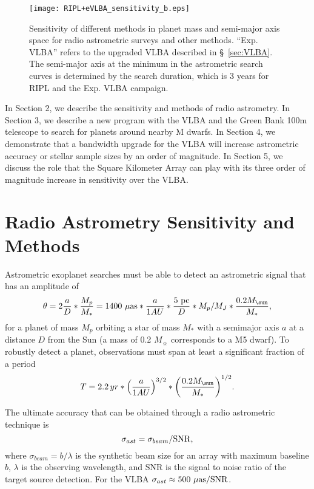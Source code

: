 \documentclass[12pt,preprint]{aastex}
\begin{document}
\begin{figure}[tb]
\texttt{[image: RIPL+eVLBA\_sensitivity\_b.eps]}
\caption{Sensitivity of different methods in planet mass and semi-major axis
space for radio astrometric surveys and other methods.
``Exp. VLBA'' refers to the upgraded VLBA described in \S~\ref{sec:VLBA}.
The semi-major axis at the 
minimum in the astrometric search curves is determined by the search duration,
which is 3 years for RIPL and the Exp. VLBA campaign.}
\label{fig:pspace}
\end{figure}

In Section 2, we describe the sensitivity and methods of radio astrometry.
In Section 3, we describe a new program with the VLBA and the Green Bank 100m
telescope to search for planets around nearby M dwarfs.  In Section 4, we
demonstrate that a bandwidth upgrade for the VLBA will increase astrometric
accuracy or stellar sample sizes by an order of magnitude.  In Section 5,
we discuss the role that the Square Kilometer Array can play with its three
order of magnitude increase in sensitivity over the VLBA.

\section{Radio Astrometry Sensitivity and Methods}

Astrometric exoplanet searches must be able to detect an astrometric
 signal that has an amplitude of
\begin{equation}
\theta = 2 {a \over D} * {M_{p} \over M_{*} } = 
1400 \muas * {a \over 1 AU} * {5 {\rm\ pc} \over D} * {M_p / M_J} * {0.2 M_\sun \over M_*},
\end{equation}
for a planet of mass $M_p$ orbiting a star of mass $M_*$ with a
semimajor axis $a$ at a distance $D$ from the Sun (a mass of 0.2
$M_\sun$ corresponds to a M5 dwarf).  To robustly detect a planet,
observations must span at least a significant fraction of a period
\begin{equation}
T = 2.2\,yr * {\left(a \over 1 AU\right)}^{3/2} * {\left(0.2 M_\sun \over M_*\right)}^{1/2}.
\end{equation}

The ultimate accuracy that can be obtained through
a radio astrometric technique is
\begin{equation}
\sigma_{ast}= \sigma_{beam} / {\rm SNR},
\end{equation}
where $\sigma_{beam}=b/\lambda$ is the synthetic beam size for an
array with maximum baseline $b$, $\lambda$ is the observing
wavelength, and SNR is the signal to noise ratio of the target source
detection. For the VLBA $\sigma_{ast}\approx500 {\rm\ \mu as}/{\rm SNR}$.
\end{document}
